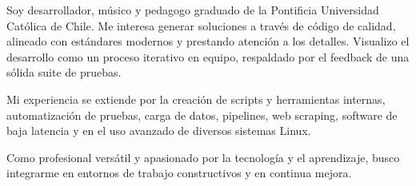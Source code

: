 

\begin{cvparagraph}

    Soy desarrollador, músico y pedagogo graduado de la Pontificia Universidad
    Católica de Chile. Me interesa generar soluciones a través de código de calidad,
    alineado con estándares modernos y prestando atención a los detalles.
    Visualizo el desarrollo como un proceso iterativo en equipo, respaldado por
    el feedback de una sólida suite de pruebas.

    Mi experiencia se extiende por la creación de scripts y herramientas
    internas, automatización de pruebas, carga de datos, pipelines, web
    scraping, software de baja latencia y en el uso avanzado de diversos
    sistemas Linux.

    Como profesional versátil y apasionado por la tecnología y el aprendizaje,
    busco integrarme en entornos de trabajo constructivos y en continua mejora.

\end{cvparagraph}

